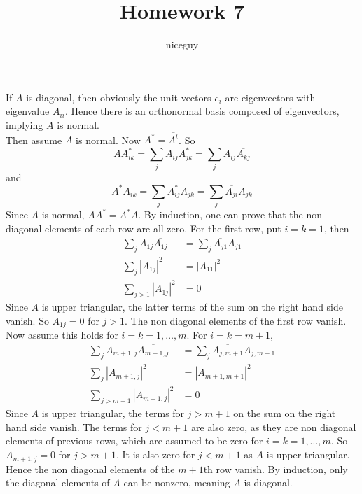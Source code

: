 \documentclass[answers]{exam}
\author{niceguy}
\title{Homework 7}
\begin{document}
\maketitle

\begin{questions}


\begin{solution}
	If $A$ is diagonal, then obviously the unit vectors $e_i$ are eigenvectors with eigenvalue $A_{ii}$. Hence there is an orthonormal basis composed of eigenvectors, implying $A$ is normal. \\
	Then assume $A$ is normal. Now $A^* = \overline{A^t}$. So
	$$AA^*_{ik} = \sum_j A_{ij}A^*_{jk} = \sum_j A_{ij}\overline{A_{kj}}$$
	and
	$$A^*A_{ik} = \sum_j A^*_{ij}A_{jk} = \sum_j \overline{A_{ji}}A_{jk}$$
	Since $A$ is normal, $AA^* = A^*A$. By induction, one can prove that the non diagonal elements of each row are all zero. For the first row, put $i=k=1$, then
	\begin{align*}
		\sum_j A_{1j}\overline{A_{1j}} &= \sum_j \overline{A_{j1}}A_{j1} \\
		\sum_j |A_{1j}|^2 &= |A_{11}|^2 \\
		\sum_{j>1} |A_{1j}|^2 &= 0
	\end{align*}
	Since $A$ is upper triangular, the latter terms of the sum on the right hand side vanish. So $A_{1j} = 0$ for $j > 1$. The non diagonal elements of the first row vanish. Now assume this holds for $i=k=1,\dots,m$. For $i=k=m+1$,
	\begin{align*}
		\sum_j A_{m+1,j}\overline{A_{m+1,j}} &= \sum_j \overline{A_{j,m+1}}A_{j,m+1} \\
		\sum_j |A_{m+1,j}|^2 &= |A_{m+1,m+1}|^2 \\
		\sum_{j>m+1} |A_{m+1,j}|^2 &= 0
	\end{align*}
	Since $A$ is upper triangular, the terms for $j>m+1$ on the sum on the right hand side vanish. The terms for $j<m+1$ are also zero, as they are non diagonal elements of previous rows, which are assumed to be zero for $i=k=1,\dots,m$. So $A_{m+1,j} = 0$ for $j > m+1$. It is also zero for $j < m+1$ as $A$ is upper triangular. Hence the non diagonal elements of the $m+1$th row vanish. By induction, only the diagonal elements of $A$ can be nonzero, meaning $A$ is diagonal.
\end{solution}


\end{questions}
\end{document}
